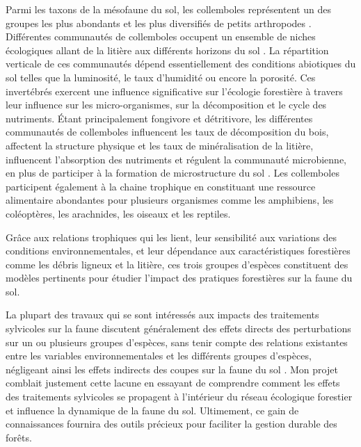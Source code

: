 Parmi les taxons de la mésofaune du sol, les collemboles représentent un des groupes les plus abondants et les plus diversifiés de petits arthropodes \citep{rusekBiodiversityCollembolaTheir1998}. 
Différentes communautés de collemboles occupent un ensemble de niches écologiques allant de la litière aux différents horizons du sol \citep{pongeVerticalDistributionCollembola2000}.
La répartition verticale de ces communautés dépend essentiellement des conditions abiotiques du sol telles que la luminosité, le taux d’humidité ou encore la porosité.
Ces invertébrés exercent une influence significative sur l'écologie forestière à travers leur influence sur les micro-organismes, sur la décomposition et le cycle des nutriments.
Étant principalement fongivore et détritivore, les différentes communautés de collemboles influencent les taux de décomposition du bois, affectent la structure physique et les taux de minéralisation de la litière, 
influencent l'absorption des nutriments et régulent la communauté microbienne, en plus de participer à la formation de microstructure du sol \citep{Petersen1982comparativeanalysis,Neher2012Linkinginvertebrate,Maass2015Functionalrole,Potapov2016Connectingtaxonomy}. 
Les collemboles participent également à la chaine trophique en constituant une ressource alimentaire abondantes pour plusieurs organismes comme les amphibiens, les coléoptères, les arachnides, les oiseaux et les reptiles.

Grâce aux relations trophiques qui les lient, leur sensibilité aux variations des conditions environnementales, et leur dépendance aux caractéristiques forestières comme les débris ligneux et la litière, 
ces trois groupes d'espèces constituent des modèles pertinents pour étudier l'impact des pratiques forestières sur la faune du sol. 

La plupart des travaux qui se sont intéressés aux impacts des traitements sylvicoles sur la faune discutent généralement des effets directs des perturbations sur un ou plusieurs groupes d'espèces, 
sans tenir compte des relations existantes entre les variables environnementales et les différents groupes d'espèces, 
négligeant ainsi les effets indirects des coupes sur la faune du sol \citep{josephIntegratingOccupancyModels2016,Pollierer2021Diversityfunctional,Kudrin2023metaanalysiseffects}. 
Mon projet comblait justement cette lacune en essayant de comprendre comment les effets des traitements sylvicoles se propagent à l’intérieur du réseau écologique forestier et influence la dynamique de la faune du sol.  
Ultimement, ce gain de connaissances fournira des outils précieux pour faciliter la gestion durable des forêts.


